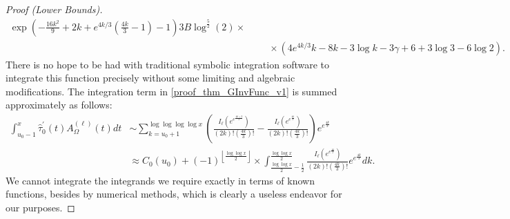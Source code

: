\documentclass[11pt,reqno,a4letter]{article}
\numberwithin{figure}{section}
\numberwithin{table}{section}
\newcommand{\Floor}[2]{\ensuremath{\left\lfloor \frac{#1}{#2} \right\rfloor}}
\theoremstyle{plain}
\numberwithin{theorem}{section}
\theoremstyle{definition}
\begin{document}
\begin{proof}[Proof (Lower Bounds)]
\begin{align*}
{     \exp \left(-\frac{16 k^2}{9}+2k+e^{4k/3} 
     \left(\frac{4k}{3}-1\right)-1\right)}{3B \log ^{\frac{5}{2}}(2)} \times \\ 
     & \phantom{=\ } \times 
     \left(4 e^{4 k/3} k-8k-3 \log k-3 \gamma +6+3 
     \log 3-6 \log 2\right).
\end{align*} 
There is no hope to be had with traditional symbolic integration software to integrate 
this function precisely without some limiting and algebraic modifications. The integration term 
in \eqref{proof_thm_GInvFunc_v1} is summed approximately as follows: 
\begin{align*} 
\int_{u_0-1}^{x} \widehat{\tau}_0^{\prime}(t) A_{\Omega}^{(\ell)}(t) dt & \sim 
     \sum_{k=u_0+1}^{\log\log\log\log x} \left( 
     \frac{I_{\ell}\left(e^{e^{\frac{4k+2}{3}}}\right)}{(2k)! \left(\frac{4k}{3}\right)!} - 
     \frac{I_{\ell}\left(e^{e^{\frac{4k}{3}}}\right)}{(2k)! \left(\frac{4k}{3}\right)!}
     \right) e^{e^{\frac{4k}{3}}} \\ 
     & \approx 
     C_0(u_0) + 
     (-1)^{\Floor{\log\log x}{2}} \times 
     \int_{\frac{\log\log x}{2}-\frac{1}{2}}^{\frac{\log\log x}{2}} 
     \frac{I_{\ell}\left(e^{e^{\frac{4k}{3}}}\right)}{(2k)! \left(\frac{4k}{3}\right)!} 
     e^{e^{\frac{4k}{3}}} dk. 
\end{align*} 
We cannot integrate the integrands we require exactly in terms of known functions, besides by 
numerical methods, which is clearly a useless endeavor for our purposes. 


\end{proof}
\end{document}
